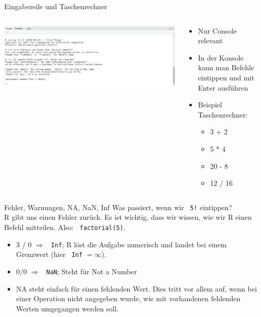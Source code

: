 \documentclass[xcolor=dvipsnames, aspectratio = 169]{beamer}
\begin{document}
\begin{frame}{Eingabezeile und Taschenrechner}
	\begin{columns}[T]
	\begin{column}{0.6\textwidth}
	\includegraphics[width=\textwidth]{Rstudio_interface_c}
	\end{column}
	\begin{column}{0.4\textwidth}
	\begin{itemize}
		\item Nur \glqq Console\grqq{} relevant
		\item In der Konsole kann man Befehle eintippen und  mit Enter ausführen
		\item Beispiel Taschenrechner:
		\begin{itemize}
			\item 3 + 2
			\item 5 * 4
			\item 20 - 8
			\item 12 / 16
		\end{itemize}
	\end{itemize}
	\end{column}
\end{columns}
\end{frame}

\begin{frame}[fragile]{Fehler, Warnungen, NA, NaN, Inf}
	Was passiert, wenn wir \verb+ 5!+ eintippen? \\
	R gibt uns einen Fehler zurück. Es ist wichtig, dass wir wissen, wie wir R einen Befehl mitteilen. Also: \verb+ factorial(5)+. \\
	\begin{itemize}
		\item 3 / 0 $\Rightarrow$ \verb+ Inf+; R löst die Aufgabe numerisch und landet bei einem Grenzwert (hier \verb+ Inf+ $=\infty$).
		\item 0/0 $\Rightarrow$ \verb+ NaN+; Steht für \glqq Not a Number\grqq{}
		\item NA steht einfach für einen fehlenden Wert. Dies tritt vor allem auf, wenn bei einer Operation nicht angegeben wurde, wie mit vorhandenen fehlenden Werten umgegangen werden soll.
		
	\end{itemize}

\end{frame}
\end{document}
